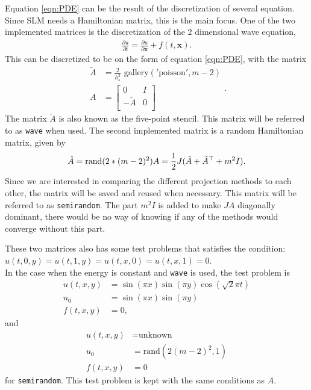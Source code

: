 Equation \eqref{eqn:PDE} can be the result of the discretization of several equation. Since SLM needs a Hamiltonian matrix, this is the main focus. One of the two implemented matrices is the discretization of the 2 dimensional wave equation, 
\begin{equation}
\begin{aligned}
\frac{\partial u}{\partial t} = \frac{\partial u}{\partial \textbf{x}} + f(t,\textbf{x}).
\end{aligned}
\label{eqn:wave}
\end{equation}
This can be discretized to be on the form of equation \eqref{eqn:PDE}, with the matrix
\begin{equation}
\begin{aligned}
\tilde{A} &= \frac{2}{h_s^2} \text{ gallery}('\text{poisson}', m-2) \\
A &= 
\begin{bmatrix}
 0 & I \\ - \tilde{A} & 0 \\
\end{bmatrix}
\end{aligned}.
\end{equation}
The matrix $\tilde{A}$ is also known as the five-point stencil. This matrix will be referred to as \texttt{wave} when used. The second implemented matrix is a random Hamiltonian matrix, given by
\begin{equation}
\hat{A} = \text{rand}(2*(m-2)^2) \\
A = \frac{1}{2} J (\hat{A} + \hat{A}^\top + m^2 I).
\end{equation}
Since we are interested in comparing the different projection methods to each other, the matrix will be saved and reused when necessary. This matrix will be referred to as \texttt{semirandom}. The part $m^2 I $ is added to make $JA$ diagonally dominant, there would be no way of knowing if any of the methods would converge without this part.%

These two matrices also has some test problems that satisfies the condition: $u(t,0,y) = u(t,1,y) = u(t,x,0) = u(t,x,1) = 0$. \\

In the case when the energy is constant and \texttt{wave} is used, the test problem is 
\begin{equation}
\begin{aligned}
u(t,x,y) &= \sin(\pi x) \sin(\pi y) \cos(\sqrt{2} \pi t) \\
u_0 &= \sin( \pi x) \sin(\pi y) \\
f(t,x,y) &= 0 ,
\end{aligned}
\end{equation}
and 
\begin{equation}
\begin{aligned}
u(t,x,y) &= \text{unknown} \\
u_0 &= \text{rand} (2 (m-2)^2,1) \\
f(t,x,y) &= 0
\end{aligned}
\end{equation}
for \texttt{semirandom}. This test problem is kept with the same conditions as $A$.

